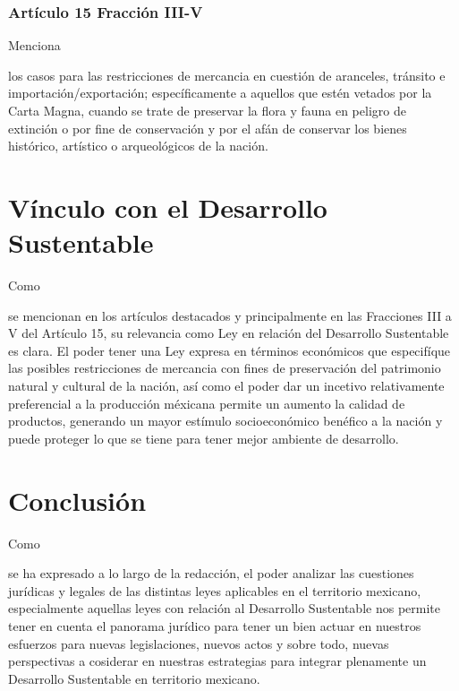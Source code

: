 \documentclass[stu, 12pt, letterpaper, donotrepeattitle, floatsintext, natbib]{apa7}
\begin{document}
\subsubsection{Artículo 15 Fracción III-V}
Menciona \begin{justifying}
    los casos para las restricciones de mercancia en cuestión de aranceles, tránsito e importación/exportación; específicamente a aquellos que estén vetados por la Carta Magna, cuando se trate de preservar la flora y fauna
    en peligro de extinción o por fine de conservación y por el afán de conservar los bienes histórico, artístico o arqueológicos de la nación.\par
\end{justifying}
\vspace{\baselineskip}
\section{Vínculo con el Desarrollo Sustentable}
Como \begin{justifying}
    se mencionan en los artículos destacados y principalmente en las Fracciones III a V del Artículo 15, su relevancia como Ley en relación del Desarrollo Sustentable es clara. El poder tener una Ley expresa en términos económicos
    que especifíque las posibles restricciones de mercancia con fines de preservación del patrimonio natural y cultural de la nación, así como el poder dar un incetivo relativamente preferencial a la producción méxicana permite 
    un aumento la calidad de productos, generando un mayor estímulo socioeconómico benéfico a la nación y puede proteger lo que se tiene para tener mejor ambiente de desarrollo.\par
\end{justifying}
\vspace{\baselineskip}
\section*{Conclusión}
Como \begin{justifying}
   se ha expresado a lo largo de la redacción, el poder analizar las cuestiones jurídicas y legales de las distintas leyes aplicables en el territorio mexicano, especialmente aquellas leyes con relación al Desarrollo Sustentable nos permite
   tener en cuenta el panorama jurídico para tener un bien actuar en nuestros esfuerzos para nuevas legislaciones, nuevos actos y sobre todo, nuevas perspectivas a cosiderar en nuestras estrategias para integrar plenamente un Desarrollo Sustentable en
   territorio mexicano.\par
\end{justifying}

\newpage
\setcounter{secnumdepth}{0} %
\renewcommand\refname{\textbf{Referencias}}

\end{document}
